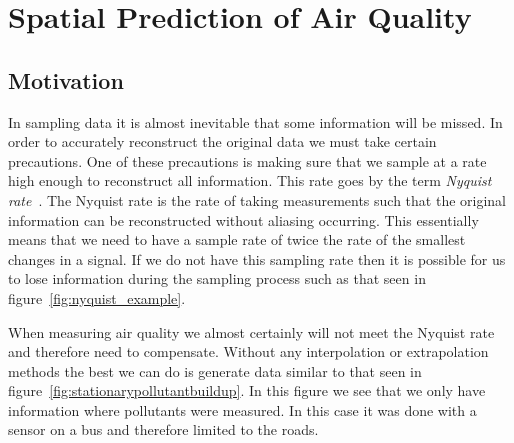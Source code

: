\chapter{Spatial Prediction of Air Quality}\label{prediction_evaluation}

	\section{Motivation}\label{prediction_evaluation_motivation}

		In sampling data it is almost inevitable that some information will be missed. In order to accurately reconstruct the original data we must take certain precautions. One of these precautions is making sure that we sample at a rate high enough to reconstruct all information. This rate goes by the term \emph{Nyquist rate}~\cite{nyquistrate}. The Nyquist rate is the rate of taking measurements such that the original information can be reconstructed without aliasing occurring. This essentially means that we need to have a sample rate of twice the rate of the smallest changes in a signal. If we do not have this sampling rate then it is possible for us to lose information during the sampling process such as that seen in figure~\ref{fig:nyquist_example}.


		When measuring air quality we almost certainly will not meet the Nyquist rate and therefore need to compensate. Without any interpolation or extrapolation methods the best we can do is generate data similar to that seen in figure~\ref{fig:stationarypollutantbuildup}. In this figure we see that we only have information where pollutants were measured. In this case it was done with a sensor on a bus and therefore limited to the roads. 


